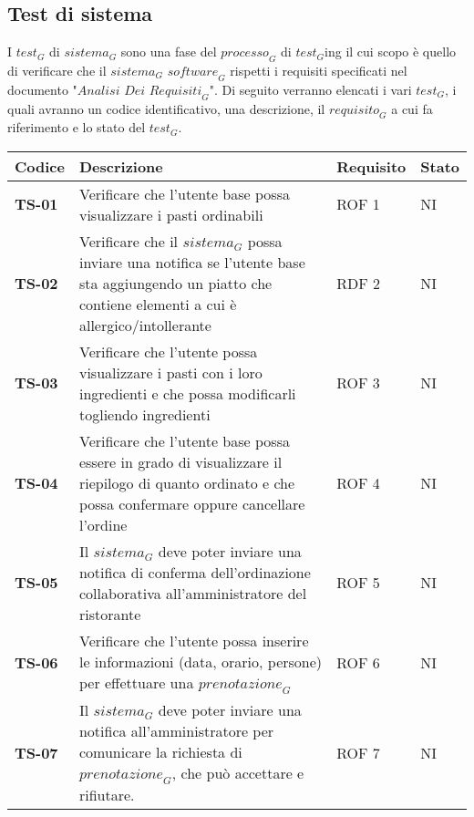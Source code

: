 \subsection{Test di sistema}
I $\textit{test}_G$ di $\textit{sistema}_G$ sono una fase del $\textit{processo}_G$ di $\textit{test}_G$ing il cui scopo è quello di verificare che il $\textit{sistema}_G$ $\textit{software}_G$ rispetti i requisiti specificati nel documento "$\textit{Analisi Dei Requisiti}_G$".
Di seguito verranno elencati i vari $\textit{test}_G$, i quali avranno un codice identificativo, una descrizione, il $\textit{requisito}_G$ a cui fa riferimento e lo stato del $\textit{test}_G$.
    \begin{longtable}{|>{\centering\arraybackslash}p{1.5cm}|p{12cm}|p{2cm}|p{1cm}|}
  \hline
  \rowcolor{gray!30}
  \textbf{Codice} & \textbf{Descrizione} & \textbf{Requisito} & \textbf{Stato} \\
  \hline
  \rowcolor{gray!10}
  \textbf{TS-01} & Verificare che l'utente base possa visualizzare i pasti ordinabili & ROF 1 & NI \\
  \hline
  \rowcolor{gray!10}
  \textbf{TS-02} & Verificare che il $\textit{sistema}_G$ possa inviare una notifica se l'utente base sta aggiungendo un piatto che contiene elementi a cui è allergico/intollerante & RDF 2 & NI \\ 
  \hline 
  \rowcolor{gray!10}
  \textbf{TS-03} & Verificare che l'utente possa visualizzare i pasti con i loro ingredienti e che possa modificarli togliendo ingredienti & ROF 3 & NI \\ 
  \hline
  \rowcolor{gray!10}
  \textbf{TS-04} & Verificare che l'utente base possa essere in grado di visualizzare il riepilogo di quanto ordinato e che possa confermare oppure cancellare l'ordine & ROF 4 & NI \\ 
  \hline
  \rowcolor{gray!10}
  \textbf{TS-05} & Il $\textit{sistema}_G$ deve poter inviare una notifica di conferma dell’ordinazione collaborativa all’amministratore del ristorante & ROF 5 & NI \\ 
  \hline
  \rowcolor{gray!10}
  \textbf{TS-06} & Verificare che l'utente possa inserire le informazioni (data, orario, persone) per effettuare una $\textit{prenotazione}_G$ & ROF 6 & NI \\
  \hline
  \rowcolor{gray!10}
  \textbf{TS-07} & Il $\textit{sistema}_G$ deve poter inviare una notifica all’amministratore per comunicare la richiesta di $\textit{prenotazione}_G$, che può accettare e rifiutare. & ROF 7 & NI \\

\end{longtable}
